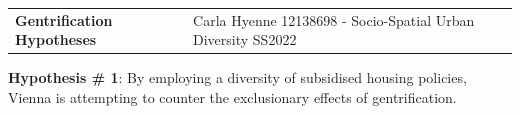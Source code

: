 \documentclass{article}
\begin{document}
\pagebreak


\begin{tabular}{p{} p{}}
\large\textbf{{Gentrification Hypotheses}} &
Carla Hyenne 12138698 - Socio-Spatial Urban Diversity SS2022 \\
\end{tabular}


\textbf{Hypothesis \# 1}: By employing a diversity of subsidised housing policies, Vienna is attempting to counter the exclusionary effects of gentrification.
\end{document}
